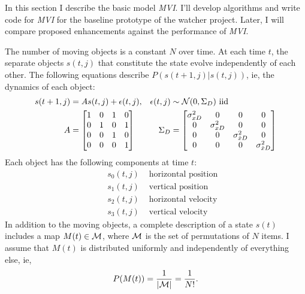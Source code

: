 \documentclass[12pt]{article}
\newcommand{\normal}[2]{{\cal N}(#1,#2)}
\newcommand{\xdot}{{\dot x}}
\newcommand{\M}{{\cal M}}
\newcommand{\ti}[2]{{#1}{(#2)}}                         %
\begin{document}
In this section I describe the basic model \emph{MVI}.  I'll develop
algorithms and write code for \emph{MVI} for the baseline prototype of
the watcher project.  Later, I will compare proposed enhancements
against the performance of \emph{MVI}.

The number of moving objects is a constant $N$ over time.  At each
time $t$, the separate objects $\ti{s}{t,j}$ that constitute the state
evolve independently of each other.  The following equations describe
$P(\ti{s}{t+1,j}|\ti{s}{t,j})$, ie, the dynamics of each object:
\begin{subequations}
  \label{eq:dynamics}
  \begin{align}
    \ti{s}{t+1,j} &= A  \ti{s}{t,j} + \ti{\epsilon}{t,j}, &
    \ti{\epsilon}{t,j} &\sim \normal{0}{\Sigma_{D}} \text{ iid} \\
    A &= \begin{bmatrix}
      1 & 0 & 1 & 0 \\
      0 & 1 & 0 & 1 \\
      0 & 0 & 1 & 0 \\
      0 & 0 & 0 & 1
    \end{bmatrix} &
    \Sigma_{D} &= \begin{bmatrix}
      \sigma^2_{xD} & 0 & 0 & 0 \\
      0 & \sigma^2_{xD} & 0 & 0 \\
      0 & 0 & \sigma^2_{\xdot D} & 0 \\
      0 & 0 & 0 & \sigma^2_{\xdot D}
    \end{bmatrix}
  \end{align}
\end{subequations}
Each object has the following components at time $t$:
\begin{align*}
  &&s_{0}(t,j) & \text{ horizontal position} \\
  &&s_{1}(t,j) & \text{ vertical position} \\
  &&s_{2}(t,j) & \text{ horizontal velocity} \\
  &&s_{3}(t,j) & \text{ vertical velocity}
\end{align*}
In addition to the moving objects, a complete description of a state
$\ti{s}{t}$ includes a map $\ti{M}{t}\in \M$, where $\M$ is the set of
permutations of $N$ items.  I assume that $\ti{M}{t}$ is distributed
uniformly and independently of everything else, ie,
\begin{equation*}
  P(\ti{M}{t}) = \frac{1}{\left| \M\right|} =  \frac{1}{N!}.
\end{equation*}
\end{document}
